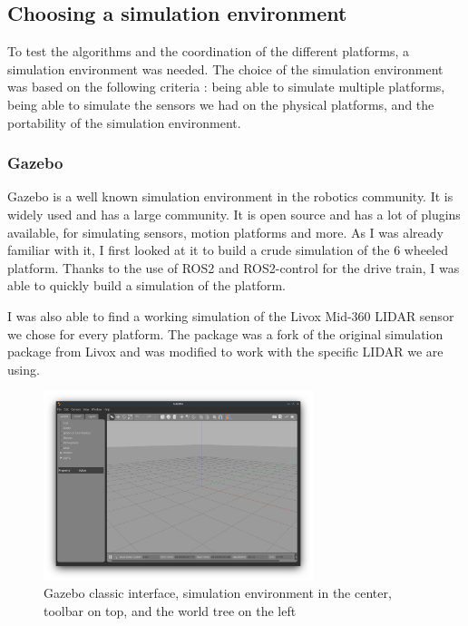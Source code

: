 \documentclass[12pt]{article}
\begin{document}
    \subsection{Choosing a simulation environment}

        To test the algorithms and the coordination of the different platforms, a simulation environment was needed. The choice of the simulation environment was based on the following criteria : being able to simulate multiple platforms, being able to simulate the sensors we had on the physical platforms, and the portability of the simulation environment.


        \subsubsection{Gazebo}
            Gazebo is a well known simulation environment in the robotics community. It is widely used and has a large community. It is open source and has a lot of plugins available, for simulating sensors, motion platforms and more. As I was already familiar with it, I first looked at it to build a crude simulation of the 6 wheeled platform. Thanks to the use of ROS2 and ROS2-control for the drive train, I was able to quickly build a simulation of the platform. 

            I was also able to find a working simulation of the Livox Mid-360 LIDAR sensor we chose for every platform. The package \cite{livox_lidar_simulation_fork} was a fork of the original simulation package from Livox \cite{livox_laser_simulation} and was modified to work with the specific LIDAR we are using.
            
            \begin{figure}[H]
                \centering
                \includegraphics[width=0.7\textwidth]{Images/gazebo_interface.png}
                \caption{Gazebo classic interface, simulation environment in the center, toolbar on top, and the world tree on the left}
                \label{fig:gazebo_simulation}
            \end{figure}
\end{document}
